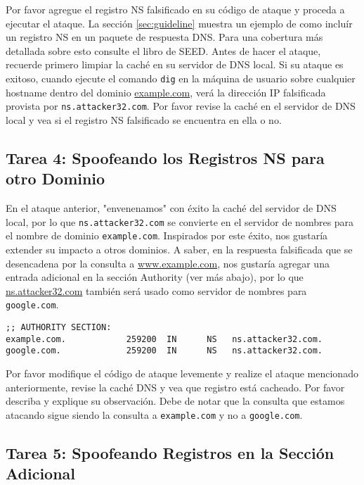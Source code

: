 Por favor agregue el registro NS falsificado en su código de ataque y proceda a ejecutar el ataque. La sección \ref{sec:guideline} muestra un ejemplo de como incluír un registro NS en un paquete de respuesta DNS.
Para una cobertura más detallada sobre esto consulte el libro de SEED.
Antes de hacer el ataque, recuerde primero limpiar la caché en su servidor de DNS local.
Si su ataque es exitoso, cuando ejecute el comando \texttt{dig} en la máquina de usuario sobre cualquier hostname dentro del dominio \url{example.com}, verá la dirección IP falsificada provista por \texttt{ns.attacker32.com}. Por favor revise la caché en el servidor de DNS local y vea si el registro NS falsificado se encuentra en ella o no.



\subsection{Tarea 4: Spoofeando los Registros NS para otro Dominio} 

En el ataque anterior, "envenenamos" con éxito la caché del servidor de DNS local, por lo que \texttt{ns.attacker32.com} se convierte en el servidor de nombres para el nombre de dominio \texttt{example.com}. Inspirados por este éxito, nos gustaría extender su impacto a otros dominios. A saber, en la respuesta falsificada que se desencadena por la consulta a \url{www.example.com}, nos gustaría agregar una entrada adicional en la sección Authority (ver más abajo), por lo que \url{ns.attacker32.com} también será usado como servidor de nombres para \texttt{google.com}.


\begin{lstlisting}
;; AUTHORITY SECTION:
example.com.            259200  IN      NS   ns.attacker32.com.
google.com.             259200  IN      NS   ns.attacker32.com.
\end{lstlisting}

Por favor modifique el código de ataque levemente y realize el ataque mencionado anteriormente, revise la caché DNS y vea que registro está cacheado.
Por favor describa y explique su observación. Debe de notar que la consulta que estamos atacando sigue siendo la consulta a \texttt{example.com} y no a \texttt{google.com}.  


\subsection{Tarea 5: Spoofeando Registros en la Sección Adicional}


